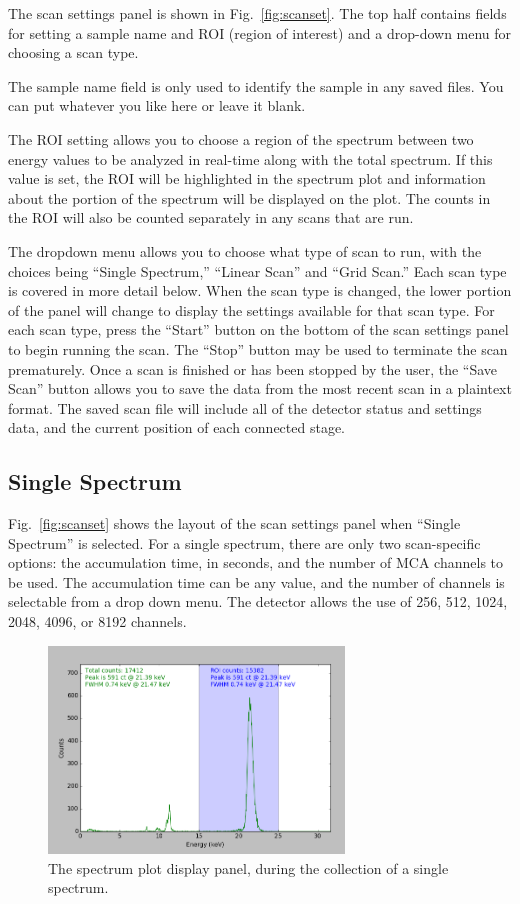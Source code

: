 The scan settings panel is shown in Fig.~\ref{fig:scanset}. The top half
contains fields for setting a sample name and ROI (region of interest) and a
drop-down menu for choosing a scan type.

The sample name field is only used to identify the sample in any saved
files. You can put whatever you like here or leave it blank.

The ROI setting allows you to choose a region of the spectrum between two energy
values to be analyzed in real-time along with the total spectrum. If this value
is set, the ROI will be highlighted in the spectrum plot and information about
the portion of the spectrum will be displayed on the plot. The counts in the ROI
will also be counted separately in any scans that are run.

The dropdown menu allows you to choose what type of scan to run, with the
choices being ``Single Spectrum,'' ``Linear Scan'' and ``Grid Scan.'' Each scan
type is covered in more detail below. When the scan type is changed, the lower
portion of the panel will change to display the settings available for that scan
type.  For each scan type, press the ``Start'' button on the bottom of the scan
settings panel to begin running the scan. The ``Stop'' button may be used to
terminate the scan prematurely. Once a scan is finished or has been stopped by
the user, the ``Save Scan'' button allows you to save the data from the most
recent scan in a plaintext format. The saved scan file will include all of the
detector status and settings data, and the current position of each connected
stage.

\subsection{Single Spectrum}

Fig.~\ref{fig:scanset} shows the layout of the scan settings panel when ``Single
Spectrum'' is selected. For a single spectrum, there are only two scan-specific
options: the accumulation time, in seconds, and the number of MCA channels to be
used. The accumulation time can be any value, and the number of channels is
selectable from a drop down menu. The detector allows the use of 256, 512, 1024,
2048, 4096, or 8192 channels.

\begin{figure}
\centering \includegraphics[width=0.7\textwidth]{specplot.png}
\caption{\label{fig:specplot} The spectrum plot display panel, during the
  collection of a single spectrum.}
\end{figure}

